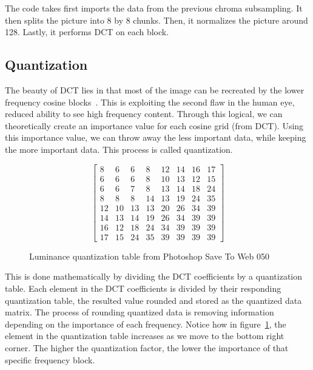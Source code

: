 \documentclass{article}
\begin{document}
The code takes first imports the data from the previous chroma subsampling.
It then splits the picture into 8 by 8 chunks.
Then, it normalizes the picture around 128.
Lastly, it performs DCT on each block.

\subsection{Quantization}\label{quantize}
The beauty of DCT lies in that most of the image can be recreated by the lower frequency cosine blocks~\autocite{jpgYT}.
This is exploiting the second flaw in the human eye, reduced ability to see high frequency content.
Through this logical, we can theoretically create an importance value for each cosine grid (from DCT).
Using this importance value, we can throw away the less important data, while keeping the more important data.
This process is called quantization.

\begin{figure}[h]
\centering
\begin{equation*}
	\begin{bmatrix}
		8  & 6  & 6  & 8  & 12 & 14 & 16 & 17 \\
		6  & 6  & 6  & 8  & 10 & 13 & 12 & 15 \\
		6  & 6  & 7  & 8  & 13 & 14 & 18 & 24 \\
		8  & 8  & 8  & 14 & 13 & 19 & 24 & 35 \\
		12 & 10 & 13 & 13 & 20 & 26 & 34 & 39 \\
		14 & 13 & 14 & 19 & 26 & 34 & 39 & 39 \\
		16 & 12 & 18 & 24 & 34 & 39 & 39 & 39 \\
		17 & 15 & 24 & 35 & 39 & 39 & 39 & 39
	\end{bmatrix}
\end{equation*}
\label{quantization}
\caption{Luminance quantization table from Photoshop Save To Web 050~\autocite{quantization}}
\end{figure}

This is done mathematically by dividing the DCT coefficients by a quantization table.
Each element in the DCT coefficients is divided by their responding quantization table, the resulted value rounded and stored as the quantized data matrix.
The process of rounding quantized data is removing information depending on the importance of each frequency.
Notice how in figure~\ref{quantization}, the element in the quantization table increases as we move to the bottom right corner.
The higher the quantization factor, the lower the importance of that specific frequency block.
\end{document}
